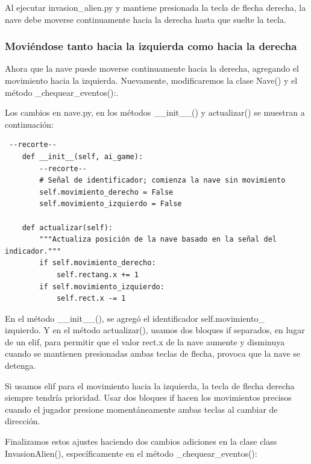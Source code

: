 Al  ejecutar {\ttfamily invasion\_alien.py} y mantiene presionada la tecla de flecha derecha, la nave debe moverse continuamente hacia la
derecha hasta que suelte la tecla.


\subsubsection{Moviéndose tanto hacia la izquierda como hacia la derecha}

Ahora que la nave puede moverse continuamente hacia la derecha, agregando el movimiento
hacia la izquierda. Nuevamente, modificaremos la clase {\ttfamily Nave()} y el método  {\ttfamily \_chequear\_eventos()}:. 

Los cambios en {\ttfamily nave.py},  en los métodos  {\ttfamily \_\_init\_\_()}  y {\ttfamily actualizar()} se muestran a continuación:

\hspace{-2.0cm}{\ttfamily \scriptsize nave.py}  \vspace{-0.5cm}
\begin{lstlisting}	
 --recorte--
    def __init__(self, ai_game):
        --recorte--
        # Señal de identificador; comienza la nave sin movimiento
        self.movimiento_derecho = False
        self.movimiento_izquierdo = False

    def actualizar(self):
        """Actualiza posición de la nave basado en la señal del indicador."""
        if self.movimiento_derecho:
            self.rectang.x += 1
        if self.movimiento_izquierdo:
            self.rect.x -= 1	
\end{lstlisting}

En el método {\ttfamily \_\_init\_\_()}, se agregó  el identificador {\ttfamily self.movimiento\_\\izquierdo}. 
Y en el método {\ttfamily actualizar()}, usamos dos bloques {\ttfamily if} separados, en lugar de un {\ttfamily elif}, para permitir que
el valor {\ttfamily rect.x} de la nave aumente y  disminuya cuando se mantienen presionadas ambas teclas de flecha, provoca que la nave se detenga. 

Si usamos {\ttfamily elif} para el movimiento hacia la izquierda, la tecla de flecha derecha siempre tendría prioridad. 
Usar dos bloques {\ttfamily if} hacen los movimientos precisos cuando el jugador  presione momentáneamente
ambas teclas al cambiar de dirección.


Finalizamos estos ajustes haciendo dos cambios adiciones en la clase {\ttfamily class InvasionAlien()}, específicamente   en el método  {\ttfamily  \_chequear\_eventos()}: 



